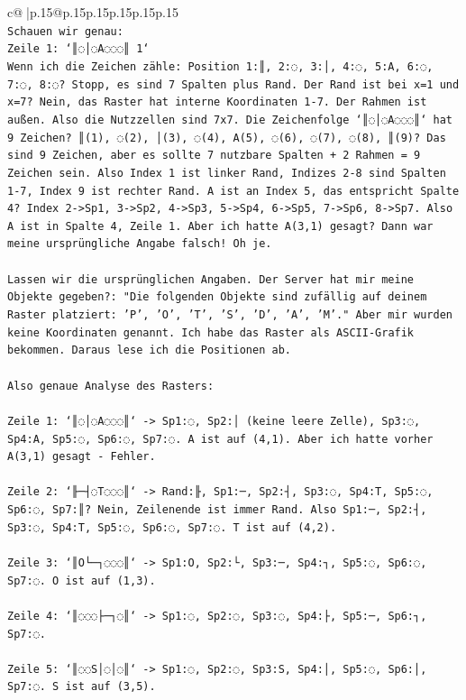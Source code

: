 \documentclass{article}
\begin{document}
{\begin{supertabular}{c@{$\;$}|p{.15\linewidth}@{}p{.15\linewidth}p{.15\linewidth}p{.15\linewidth}p{.15\linewidth}p{.15\linewidth}}
{{{\\ 
\texttt{Schauen wir genau: } \\
\texttt{Zeile 1: `║◌│◌A◌◌◌║ 1`} \\
\texttt{Wenn ich die Zeichen zähle: Position 1:║, 2:◌, 3:│, 4:◌, 5:A, 6:◌, 7:◌, 8:◌? Stopp, es sind 7 Spalten plus Rand. Der Rand ist bei x=1 und x=7? Nein, das Raster hat interne Koordinaten 1{-}7. Der Rahmen ist außen. Also die Nutzzellen sind 7x7. Die Zeichenfolge `║◌│◌A◌◌◌║` hat 9 Zeichen? ║(1), ◌(2), │(3), ◌(4), A(5), ◌(6), ◌(7), ◌(8), ║(9)? Das sind 9 Zeichen, aber es sollte 7 nutzbare Spalten + 2 Rahmen = 9 Zeichen sein. Also Index 1 ist linker Rand, Indizes 2{-}8 sind Spalten 1{-}7, Index 9 ist rechter Rand. A ist an Index 5, das entspricht Spalte 4? Index 2{-}>Sp1, 3{-}>Sp2, 4{-}>Sp3, 5{-}>Sp4, 6{-}>Sp5, 7{-}>Sp6, 8{-}>Sp7. Also A ist in Spalte 4, Zeile 1. Aber ich hatte A(3,1) gesagt? Dann war meine ursprüngliche Angabe falsch! Oh je.} \\
\\ 
\texttt{Lassen wir die ursprünglichen Angaben. Der Server hat mir meine Objekte gegeben?: "Die folgenden Objekte sind zufällig auf deinem Raster platziert: 'P', 'O', 'T', 'S', 'D', 'A', 'M'." Aber mir wurden keine Koordinaten genannt. Ich habe das Raster als ASCII{-}Grafik bekommen. Daraus lese ich die Positionen ab.} \\
\\ 
\texttt{Also genaue Analyse des Rasters:} \\
\\ 
\texttt{Zeile 1: `║◌│◌A◌◌◌║` {-}> Sp1:◌, Sp2:│ (keine leere Zelle), Sp3:◌, Sp4:A, Sp5:◌, Sp6:◌, Sp7:◌. A ist auf (4,1). Aber ich hatte vorher A(3,1) gesagt {-} Fehler.} \\
\\ 
\texttt{Zeile 2: `╟─┤◌T◌◌◌║` {-}> Rand:╟, Sp1:─, Sp2:┤, Sp3:◌, Sp4:T, Sp5:◌, Sp6:◌, Sp7:║? Nein, Zeilenende ist immer Rand. Also Sp1:─, Sp2:┤, Sp3:◌, Sp4:T, Sp5:◌, Sp6:◌, Sp7:◌. T ist auf (4,2).} \\
\\ 
\texttt{Zeile 3: `║O└─┐◌◌◌║` {-}> Sp1:O, Sp2:└, Sp3:─, Sp4:┐, Sp5:◌, Sp6:◌, Sp7:◌. O ist auf (1,3).} \\
\\ 
\texttt{Zeile 4: `║◌◌◌├─┐◌║` {-}> Sp1:◌, Sp2:◌, Sp3:◌, Sp4:├, Sp5:─, Sp6:┐, Sp7:◌.} \\
\\ 
\texttt{Zeile 5: `║◌◌S│◌│◌║` {-}> Sp1:◌, Sp2:◌, Sp3:S, Sp4:│, Sp5:◌, Sp6:│, Sp7:◌. S ist auf (3,5).} \\
}}}
\end{supertabular}}
\end{document}
